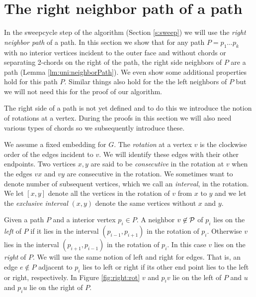 
\section{The right neighbor path of a path}
\thispagestyle{plain}
  \label{s:rightNeighbour}
  In the sweepcycle step of the algorithm (Section \ref{s:sweep}) we will use the \emph{right neighbor path} of a path. In this section we show that for any path $P = p_1 \ldots p_k$ with no interior vertices incident to the outer face and without chords or separating 2-chords on the right of the path, the right side neighbors of $P$ are a path (Lemma \ref{lm:uni:neighborPath}).
  We even show some additional properties hold for this path $P$.
  Similar things also hold for the the left neighbors of $P$ but we will not need this for the proof of our algorithm.

  The right side of a path is not yet defined and to do this we introduce the notion of rotations at a vertex. During the proofs in this section we will also need various types of chords so we subsequently introduce these.

    We assume a fixed embedding for $G$. The \emph{rotation} at a vertex $v$ is the clockwise order of the edges incident to $v$. We will identify these edges with their other endpoints.
    Two vertices $x, y$ are said to be \emph{consecutive} in the rotation at $v$ when the edges $vx$ and $vy$ are consecutive in the rotation.
    We sometimes want to denote number of subsequent vertices, which we call an \emph{interval}, in the rotation. We let $[x,y]$ denote all the vertices in the rotation of $v$ from $x$ to $y$ and we let the \emph{exclusive interval} $(x,y)$ denote the same vertices without $x$ and $y$.

    Given a path $P$ and a interior vertex $p_i \in P$. A neighbor $v \not \in \mathcal{P}$ of $p_i$ lies on the \emph{left} of $P$ if it lies in the interval $(p_{i-1}, p_{i+1})$ in the rotation of $p_{i}$. Otherwise $v$ lies in the interval $(p_{i+1}, p_{i-1})$ in the rotation of $p_i$. In this case $v$ lies on the \emph{right} of $P$.
    We will use the same notion of left and right for edges. That is, an edge $e\nin P$ adjacent to $p_i$ lies to left or right if its other end point lies to the left or right, respectively. In Figure \ref{fig:right:rot} $v$ and $p_i v$ lie on the left of $P$ and $u$ and $p_i u$ lie on the right of $P$.

